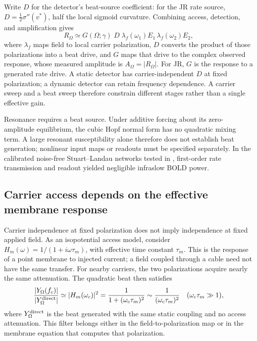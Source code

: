 \documentclass[a4paper]{article}
\newcommand{\Sig}{\sigma}
\newcommand{\half}{\tfrac{1}{2}}
\begin{document}
Write $D$ for the detector's beat-source coefficient: for the JR rate source,
$D=\half\Sig''(v^*)$, half the local sigmoid curvature. Combining access,
detection, and amplification gives
\begin{equation}
R_\Omega\simeq G(\Omega;\gamma)\;D\;\lambda_f(\omega_1)E_1\,\lambda_f(\omega_2)E_2 ,
\label{eq:receiver}
\end{equation}
\makeatletter\begingroup\edef\@currentlabel{\theequation}\label{eq:spatial}\endgroup\makeatother
where $\lambda_f$ maps field to local carrier polarization, $D$ converts the
product of those polarizations into a beat drive, and $G$ maps that drive to the
complex observed response, whose measured amplitude is $A_\Omega=|R_\Omega|$.
For JR, $G$ is the response to a generated rate drive.
A static detector has carrier-independent $D$ at fixed polarization;
a dynamic detector can retain frequency dependence. A carrier sweep and a beat sweep
therefore constrain different stages rather than a single effective gain.

Resonance requires a beat source. Under additive forcing about its zero-amplitude
equilibrium, the cubic Hopf normal form has no quadratic mixing term.
A large resonant susceptibility alone therefore does not establish beat generation;
nonlinear input maps or readouts must be specified separately.
In the calibrated noise-free Stuart--Landau networks tested in \cite{Ruffini2026iso},
first-order rate transmission and readout yielded negligible infraslow BOLD power.

\subsection{Carrier access depends on the effective membrane response}\label{sec:khz}
Carrier independence at fixed polarization does not imply independence at fixed
applied field. As an isopotential access model, consider
$H_m(\omega)=1/(1+i\omega\tau_m)$, with effective time constant $\tau_m$.
This is the response of a point membrane to injected current; a field coupled
through a cable need not have the same transfer.
For nearby carriers, the two polarizations acquire nearly the same attenuation.
The quadratic beat then satisfies
\begin{equation}
\frac{|Y_\Omega(f_c)|}{|Y_\Omega^{\rm direct}|}
\simeq |H_m(\omega_c)|^2
=\frac{1}{1+(\omega_c\tau_m)^2}
\sim\frac{1}{(\omega_c\tau_m)^2}
\quad(\omega_c\tau_m\gg1),
\label{eq:khz}
\end{equation}
where $Y_\Omega^{\rm direct}$ is the beat generated with the same static coupling
and no access attenuation. This filter belongs either in the field-to-polarization
map or in the membrane equation that computes that polarization.
\end{document}
